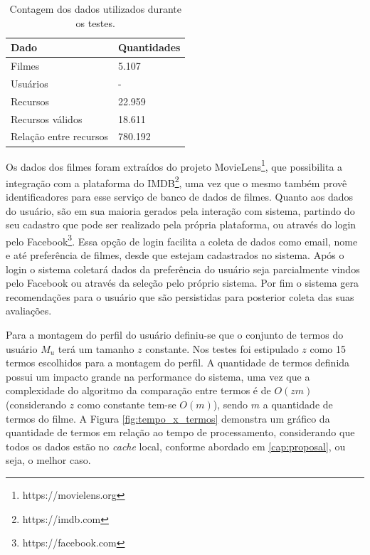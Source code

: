 \begin{table}[H]
\centering
\def\arraystretch{1.3}
\begin{tabular}{|l|l|}
	\hline
	\textbf{Dado}          & \textbf{Quantidades}   \\ \hline
	Filmes                 & 5.107                  \\ \hline
	Usuários               & - 						\\ \hline
	Recursos               & 22.959                 \\ \hline
	Recursos válidos       & 18.611                 \\ \hline
	Relação entre recursos & 780.192                \\ \hline
\end{tabular}
\caption{Contagem dos dados utilizados durante os testes.}
\label{tab:dataset}
\end{table}

Os dados dos filmes foram extraídos do projeto MovieLens\footnote{https://movielens.org}, que possibilita a integração com a plataforma do IMDB\footnote{https://imdb.com}, uma vez que o mesmo também provê identificadores para esse serviço de banco de dados de filmes. Quanto aos dados do usuário, são em sua maioria gerados pela interação com sistema, partindo do seu cadastro que pode ser realizado pela própria plataforma, ou através do login pelo Facebook\footnote{https://facebook.com}. Essa opção de login facilita a coleta de dados como email, nome e até preferência de filmes, desde que estejam cadastrados no sistema. Após o login o sistema coletará dados da preferência do usuário seja parcialmente vindos pelo Facebook ou através da seleção pelo próprio sistema. Por fim o sistema gera recomendações para o usuário que são persistidas para posterior coleta das suas avaliações.

Para a montagem do perfil do usuário definiu-se que o conjunto de termos do usuário $M_u$ terá um tamanho $z$ constante. Nos testes foi estipulado $z$ como 15 termos escolhidos para a montagem do perfil. A quantidade de termos definida possui um impacto grande na performance do sistema, uma vez que a complexidade do algoritmo da comparação entre termos é de $O(zm)$ (considerando $z$ como constante tem-se $O(m)$), sendo $m$ a quantidade de termos do filme. A Figura \ref{fig:tempo_x_termos} demonstra um gráfico da quantidade de termos em relação ao tempo de processamento, considerando que todos os dados estão no \textit{cache} local, conforme abordado em \ref{cap:proposal}, ou seja, o melhor caso.


